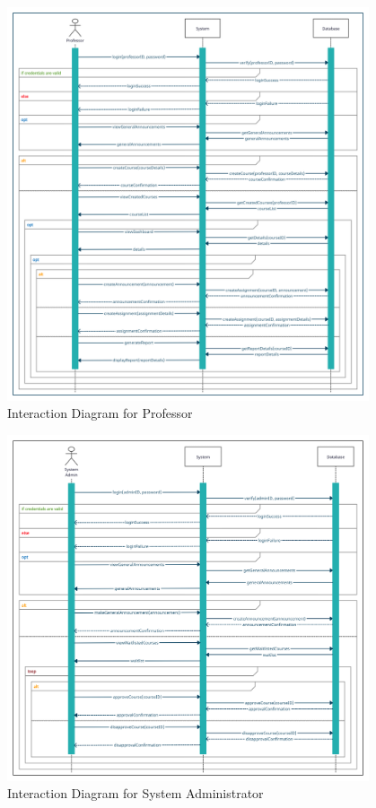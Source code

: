 \documentclass[12pt, a4]{report}
\begin{document}
\newpage
\begin{figure}[h]
    \centering
    \includegraphics[width=0.95\textwidth]{Diagrams/Professor Interaction Diagram.png}
    \caption{Interaction Diagram for Professor}
\end{figure}

\newpage
\begin{figure}[h]
    \centering
    \includegraphics[width=0.95\textwidth]{Diagrams/System Administrator Interaction Diagram.png}
    \caption{Interaction Diagram for System Administrator}
\end{figure}
\end{document}
